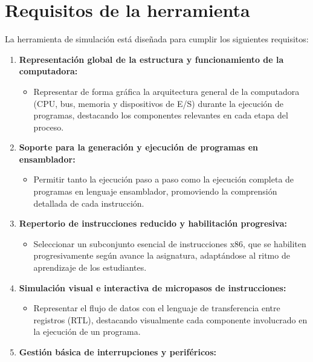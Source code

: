 \documentclass[12pt,oneside]{templates/unerthesis}
\providecommand{\tightlist}{%
  \setlength{\itemsep}{0pt}\setlength{\parskip}{0pt}}
\begin{document}
\hypertarget{requisitos-de-la-herramienta}{%
\section{Requisitos de la herramienta}\label{requisitos-de-la-herramienta}}

La herramienta de simulación está diseñada para cumplir los siguientes requisitos:

\begin{enumerate}
\def\labelenumi{\arabic{enumi}.}
\tightlist
\item
  \textbf{Representación global de la estructura y funcionamiento de la computadora:}

  \begin{itemize}
  \tightlist
  \item
    Representar de forma gráfica la arquitectura general de la computadora (CPU, bus, memoria y dispositivos de E/S) durante la ejecución de programas, destacando los componentes relevantes en cada etapa del proceso.
  \end{itemize}
\item
  \textbf{Soporte para la generación y ejecución de programas en ensamblador:}

  \begin{itemize}
  \tightlist
  \item
    Permitir tanto la ejecución paso a paso como la ejecución completa de programas en lenguaje ensamblador, promoviendo la comprensión detallada de cada instrucción.
  \end{itemize}
\item
  \textbf{Repertorio de instrucciones reducido y habilitación progresiva:}

  \begin{itemize}
  \tightlist
  \item
    Seleccionar un subconjunto esencial de instrucciones x86, que se habiliten progresivamente según avance la asignatura, adaptándose al ritmo de aprendizaje de los estudiantes.
  \end{itemize}
\item
  \textbf{Simulación visual e interactiva de micropasos de instrucciones:}

  \begin{itemize}
  \tightlist
  \item
    Representar el flujo de datos con el lenguaje de transferencia entre registros (RTL), destacando visualmente cada componente involucrado en la ejecución de un programa.
  \end{itemize}
\item
  \textbf{Gestión básica de interrupciones y periféricos:}


\end{enumerate}
\end{document}
